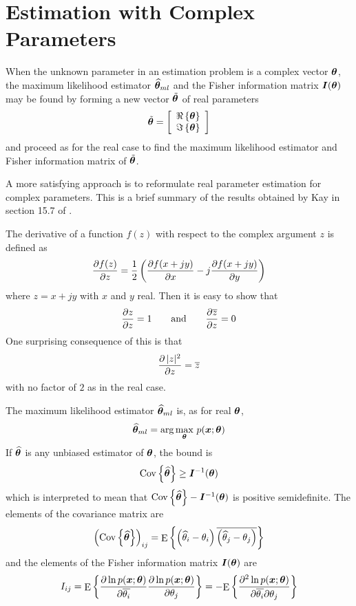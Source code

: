 \section{Estimation with Complex Parameters}
\label{mp sec:complex}

When the unknown parameter in an estimation problem is a complex vector 
$\bm{\theta}$, the maximum likelihood estimator $\widehat{\bm{\theta}}_{ml}$ and the Fisher information matrix 
$\bm{I}(\bm{\theta})$ may be found by forming a new vector $\tilde{\bm{\theta}}$ of real 
parameters
\begin{equation}
\tilde{\bm{\theta}}=\left[\begin{array}{c}\Re\left\{\bm{\theta}\right\}\\\Im\left\{\bm{\theta}\right\}\end{array}\right]
\end{equation}
and proceed as for the real case to find the maximum likelihood estimator and Fisher
information matrix of $\tilde{\bm{\theta}}$.

A more satisfying approach is to reformulate real parameter estimation 
for complex parameters.  This is a brief summary of the results
obtained by Kay in section 15.7 of \cite{Kay93}.

The derivative of a function $f(z)$ with respect to the complex argument $z$
is defined as
\begin{equation}\label{mp eqn:complex deriv}
\frac{{\partial} f(z)}{{\partial} z}=\frac{1}{2}
\left(\frac{{\partial} f(x+jy)}{{\partial} x}-j\frac{{\partial} f(x+jy)}{{\partial} y}\right)
\end{equation}
where $z=x+jy$ with $x$ and $y$ real.  Then it is easy to show that
\begin{equation}
\frac{{\partial} z}{{\partial} z}=1 \quad\quad\mbox{and}\quad\quad
\frac{{\partial}\overline{z}}{{\partial} z}=0
\end{equation}
One surprising consequence of this is that
\begin{equation}
\frac{{\partial}\,|z|^2}{{\partial} z}=\overline{z}
\end{equation}
with no factor of $2$ as in the real case.

The maximum likelihood estimator $\widehat{\bm{\theta}}_{ml}$ is, as for real $\bm{\theta}$,
\begin{equation}
\widehat{\bm{\theta}}_{ml}=\arg\max_{\bm{\theta}}\,p(\bm{x};\bm{\theta})
\end{equation}
If $\widehat{\bm{\theta}}$ is any unbiased estimator of $\bm{\theta}$, the \CR bound is
\begin{equation}
{\mathop{\rm Cov}\nolimits\left\{\widehat{\bm{\theta}}\right\}}\geq \bm{I}^{-1}(\bm{\theta})
\end{equation}
which is interpreted to mean that ${\mathop{\rm Cov}\nolimits\left\{\widehat{\bm{\theta}}\right\}}-\bm{I}^{-1}(\bm{\theta})$ is
positive semidefinite.  The elements of the covariance matrix are
\begin{equation}
\left({\mathop{\rm Cov}\nolimits\left\{\widehat{\bm{\theta}}\right\}}\right)_{ij}={\mathop{\rm E}\nolimits\left\{\left(\widehat{\theta}_{i}-\theta_{i}\right)
\overline{\left(\widehat{\theta}_{j}-\theta_{j}\right)}\right\}}
\end{equation}
and the elements of the Fisher information matrix $\bm{I}(\bm{\theta})$ are
\begin{equation}
I_{ij}={\mathop{\rm E}\nolimits\left\{\frac{{\partial}\ln p(\bm{x};\bm{\theta})}{{\partial} \overline{\theta_{i}}}
\frac{{\partial}\ln p(\bm{x};\bm{\theta})}{{\partial} \theta_{j}}\right\}}
=-{\mathop{\rm E}\nolimits\left\{\frac{{\partial}^2\ln p(\bm{x};\bm{\theta})}{{\partial} \overline{\theta_{i}}{\partial} \theta_{j}}\right\}}
\end{equation}
